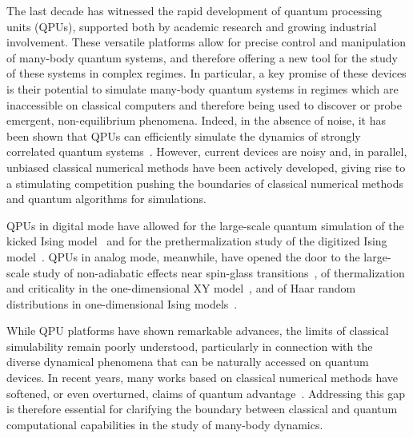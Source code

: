 \documentclass[aps,pra,reprint,amssymb,superscriptaddress]{revtex4-2}
\begin{document}
The last decade has witnessed the rapid development of quantum processing units (QPUs), supported both by academic research and growing industrial involvement. These versatile platforms allow for precise control and manipulation of many-body quantum systems, and therefore offering a new tool for the study of these systems in complex regimes. In particular, a key promise of these devices is their potential to simulate many-body quantum systems in regimes which are inaccessible on classical computers and therefore being used to discover or probe emergent, non-equilibrium phenomena.  
Indeed, in the absence of noise, it has been shown that QPUs can efficiently simulate the dynamics of strongly correlated quantum systems~\cite{feynman_simulating_1982,lloyd_universal_1996}. However, current devices are noisy and, in parallel, unbiased classical numerical methods have been actively developed, giving rise to a stimulating competition pushing the boundaries of classical numerical methods and quantum algorithms for simulations.

QPUs in digital mode have allowed for the large-scale quantum simulation of the kicked Ising model~\cite{kim_evidence_2023} and for the prethermalization study of the digitized Ising model~\cite{haghshenas_digital_2025}. QPUs in analog mode, meanwhile, have opened the door to the large-scale study of non-adiabatic effects near spin-glass transitions~\cite{kim_evidence_2023,king_beyond-classical_2025}, of thermalization and criticality in the one-dimensional XY model~\cite{andersen_thermalization_2025}, and of Haar random distributions in one-dimensional Ising models~\cite{choi_preparing_2023, shaw_benchmarking_2024}. 

While QPU platforms have shown remarkable advances, the limits of classical simulability remain poorly understood, particularly in connection with the diverse dynamical phenomena that can be naturally accessed on quantum devices. In recent years, many works based on classical numerical methods have softened, or even overturned, claims of quantum advantage~\cite{tindall_efficient_2024,mauron_challenging_2025,tindall_dynamics_2025}. Addressing this gap is therefore essential for clarifying the boundary between classical and quantum computational capabilities in the study of many-body dynamics.
\end{document}
